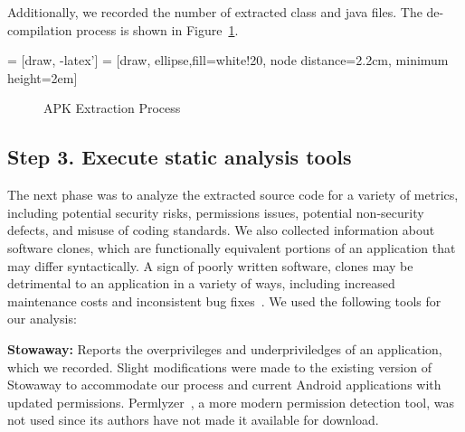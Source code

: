 \documentclass[conference]{IEEEtran}
\begin{document}
Additionally, we recorded the number of extracted class and java files. The de-compilation process is shown in Figure~\ref{fig:extractionprocess}.




 = [draw, -latex']
 = [draw, ellipse,fill=white!20, node distance=2.2cm,
    minimum height=2em]

	\begin{figure}[h]
	\begin{center}
\label{fig:extractionprocess}
\caption{APK Extraction Process}
\end{center}
\end{figure}


\subsection{Step 3. Execute static analysis tools}
\label{sec: analysis}

The next phase was to analyze the extracted source code for a variety of metrics, including potential security risks, permissions issues, potential non-security defects, and misuse of coding standards. We also collected information about software clones, which are functionally equivalent portions of an application that may differ syntactically. A sign of poorly written software, clones may be detrimental to an application in a variety of ways, including increased maintenance costs and inconsistent bug fixes~\cite{Roy:2009:CEC:1530898.1531101}. We used the following tools for our analysis:

 \textbf{Stowaway\cite{Felt:2011:APD:2046707.2046779}:} Reports the overprivileges and underpriviledges of an application, which we recorded. Slight modifications were made to the existing version of Stowaway to accommodate our process and current Android applications with updated permissions. Permlyzer~\cite{6698893}, a more modern permission detection tool, was not used since its authors have not made it available for download.
\end{document}

